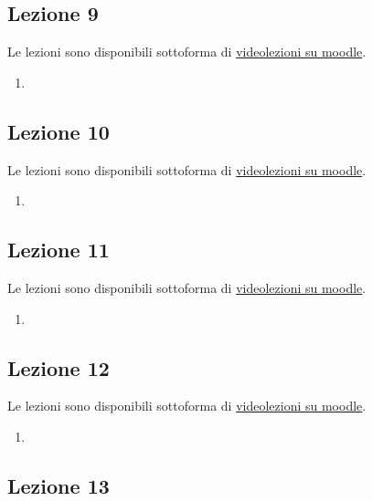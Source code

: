 \documentclass[italian]{article}
\begin{document}
    \subsection{Lezione 9}

    Le lezioni sono disponibili sottoforma di 
    \href{https://didatticaonline.unitn.it/dol/course/view.php?id=23268}{videolezioni
    su moodle}.
    
    \begin{enumerate}
      \item 
    \end{enumerate}

    \subsection{Lezione 10}

    Le lezioni sono disponibili sottoforma di 
    \href{https://didatticaonline.unitn.it/dol/course/view.php?id=23268}{videolezioni
    su moodle}.
    
    \begin{enumerate}
      \item 
    \end{enumerate}   

    \subsection{Lezione 11}

	Le lezioni sono disponibili sottoforma di 
	\href{https://didatticaonline.unitn.it/dol/course/view.php?id=23268}{videolezioni
		su moodle}.
	
	\begin{enumerate}
		\item 
	\end{enumerate}   

    \subsection{Lezione 12}

	Le lezioni sono disponibili sottoforma di 
	\href{https://didatticaonline.unitn.it/dol/course/view.php?id=23268}{videolezioni
		su moodle}.
	
	\begin{enumerate}
		\item 
	\end{enumerate}
   
    \subsection{Lezione 13}
\end{document}
